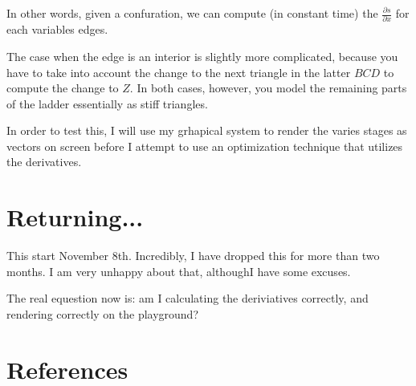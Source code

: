 \documentclass[11pt]{article}
\begin{document}
In other words, given a confuration, we can compute (in constant time) the
$\frac{\partial s}{\partial x}$ for each variables edges.

The case when the edge is an interior is slightly more complicated, because you have to take into
account the change to the next triangle in the latter $BCD$ to compute the change to $Z$.
In both cases, however, you model the remaining parts of the ladder essentially as
stiff triangles.

In order to test this, I will use my grhapical system to render the varies stages
as vectors on screen before I attempt to use an optimization technique that utilizes
the derivatives.

\section{Returning...}

This start  November 8th. Incredibly, I have dropped this for more than two months. I am very unhappy about that, althoughI have some excuses.

The real equestion now is: am I calculating the deriviatives correctly, and rendering
correctly on the playground?


\section{References}
\end{document}
